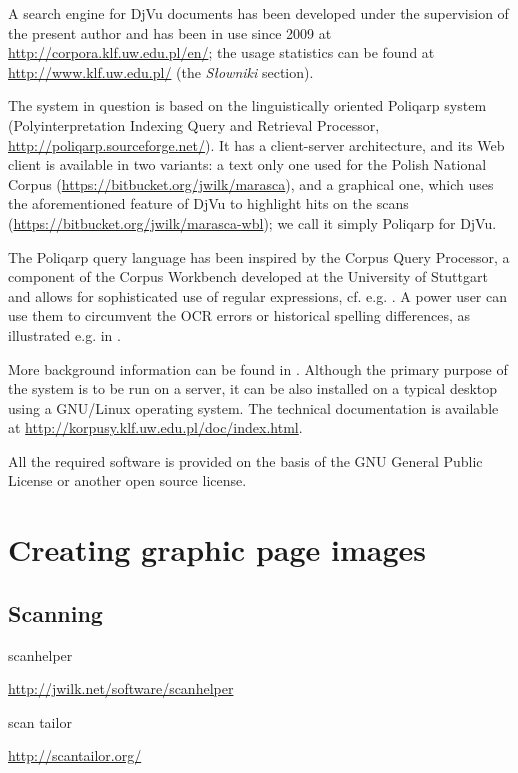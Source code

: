 \documentclass{article}
\begin{document}
A search engine for DjVu documents has been developed under the
supervision of the present author and has been in use since 2009 at
\url{http://corpora.klf.uw.edu.pl/en/}; the usage statistics can be
found at \url{http://www.klf.uw.edu.pl/} (the \textit{Słowniki}
section).

The system in question is based on the linguistically oriented
Poliqarp system (Polyinterpretation Indexing Query and Retrieval
Processor, \url{http://poliqarp.sourceforge.net/}). It has a
client-server architecture, and its Web client is available in two
variants: a text only one used for the Polish National Corpus
(\url{https://bitbucket.org/jwilk/marasca}), and a graphical one,
which uses the aforementioned feature of DjVu to highlight hits on
the scans (\url{https://bitbucket.org/jwilk/marasca-wbl}); we call it
simply Poliqarp for DjVu.

The Poliqarp query language has been inspired by the Corpus Query
Processor, a component of the Corpus Workbench developed at the
University of Stuttgart and allows for sophisticated use of regular
expressions, cf. e.g. \cite{etal04}. A power user can use them to
circumvent the OCR errors or historical spelling differences, as
illustrated e.g. in \cite{JSB2014CS}.

More background information can be found in
\cite{JSB2011LNCS}. Although the primary purpose of the system is to
be run on a server, it can be also installed on a typical desktop
using a GNU/Linux operating system. The technical documentation is
available at \url{http://korpusy.klf.uw.edu.pl/doc/index.html}.

All the required software is provided on the basis of the GNU General
Public License or another open source license.

\section{Creating graphic page images}
\label{sec:creat-page-graph}



\subsection{Scanning}
\label{sec:scanning}

scanhelper

\url{http://jwilk.net/software/scanhelper}

scan tailor

\url{http://scantailor.org/}
\end{document}
